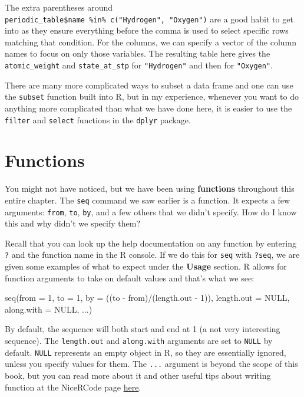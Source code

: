 \documentclass[]{tufte-book}
\newenvironment{Shaded}{\begin{snugshade}}{\end{snugshade}}
\newcommand{\AttributeTok}[1]{\textcolor[rgb]{0.77,0.63,0.00}{#1}}
\newcommand{\ConstantTok}[1]{\textcolor[rgb]{0.00,0.00,0.00}{#1}}
\newcommand{\DecValTok}[1]{\textcolor[rgb]{0.00,0.00,0.81}{#1}}
\newcommand{\FunctionTok}[1]{\textcolor[rgb]{0.00,0.00,0.00}{#1}}
\newcommand{\NormalTok}[1]{#1}
\newcommand{\SpecialCharTok}[1]{\textcolor[rgb]{0.00,0.00,0.00}{#1}}
\begin{document}
The extra parentheses around \texttt{periodic\_table\$name\ \%in\%\ c("Hydrogen",\ "Oxygen")} are a good habit to get into as they ensure everything before the comma is used to select specific rows matching that condition. For the columns, we can specify a vector of the column names to focus on only those variables. The resulting table here gives the \texttt{atomic\_weight} and \texttt{state\_at\_stp} for \texttt{"Hydrogen"} and then for \texttt{"Oxygen"}.

There are many more complicated ways to subset a data frame and one can use the \texttt{subset} function built into R, but in my experience, whenever you want to do anything more complicated than what we have done here, it is easier to use the \texttt{filter} and \texttt{select} functions in the \texttt{dplyr} package.

\hypertarget{functions}{%
\section{Functions}\label{functions}}

You might not have noticed, but we have been using \textbf{functions} throughout this entire chapter. The \texttt{seq} command we saw earlier is a function. It expects a few arguments: \texttt{from}, \texttt{to}, \texttt{by}, and a few others that we didn't specify. How do I know this and why didn't we specify them?

Recall that you can look up the help documentation on any function by entering \texttt{?} and the function name in the R console. If we do this for \texttt{seq} with \texttt{?seq}, we are given some examples of what to expect under the \textbf{Usage} section. R allows for function arguments to take on default values and that's what we see:

\begin{Shaded}
\begin{Highlighting}[]
\FunctionTok{seq}\NormalTok{(}\AttributeTok{from =} \DecValTok{1}\NormalTok{, }\AttributeTok{to =} \DecValTok{1}\NormalTok{, }\AttributeTok{by =}\NormalTok{ ((to }\SpecialCharTok{{-}}\NormalTok{ from)}\SpecialCharTok{/}\NormalTok{(length.out }\SpecialCharTok{{-}} \DecValTok{1}\NormalTok{)),}
  \AttributeTok{length.out =} \ConstantTok{NULL}\NormalTok{, }\AttributeTok{along.with =} \ConstantTok{NULL}\NormalTok{, ...)}
\end{Highlighting}
\end{Shaded}

By default, the sequence will both start and end at 1 (a not very interesting sequence). The \texttt{length.out} and \texttt{along.with} arguments are set to \texttt{NULL} by default. \texttt{NULL} represents an empty object in R, so they are essentially ignored, unless you specify values for them. The \texttt{...} argument is beyond the scope of this book, but you can read more about it and other useful tips about writing function at the NiceRCode page \href{http://nicercode.github.io/guides/functions/}{here}.
\end{document}
